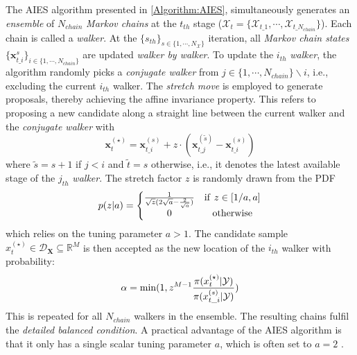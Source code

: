 The \acrshort{AIES} algorithm presented in \ref{Algorithm:AIES}, simultaneously generates an \textit{ensemble} of $N_{chain}$ \textit{Markov chains} at the $t_{th}$ stage ($\mathcal{X}_{t} = \{ \mathcal{X}_{t\_1},\cdots,\mathcal{X}_{t\_N_{chain}}\}$). Each chain is called a \textit{walker}. At the $\{s_{th}\}_{s \in \{1,\cdots,N_{\mathcal{X}}\}}$ iteration, all \textit{Markov chain states} $\{\boldsymbol{x}_{t\_i}^{s}\}_{i \in \{1,\cdots,N_{chain}\}}$ are updated \textit{walker by walker}. To update the $i_{th}$ \textit{walker}, the algorithm randomly picks a \textit{conjugate walker} from $j \in \{ 1,\cdots,N_{chain}\} \backslash i$, i.e., excluding the current $i_{th}$ walker. The \textit{stretch move} is employed to generate proposals, thereby achieving the affine invariance property. This refers to proposing a new candidate along a straight line between the current walker and the \textit{conjugate walker} with
\begin{equation}
    \label{eq: AIES walker}
\boldsymbol{x}_{t}^{(\star)}
=
\boldsymbol{x}_{t\_i}^{(s)}
+
z \cdot 
(\boldsymbol{x}_{t\_j}^{(\tilde{s})} - \boldsymbol{x}_{t\_i}^{(s)})
\end{equation}
where $\tilde{s} = s +1$ if $j < i$ and $\tilde{t}=s$ otherwise, i.e., it denotes the latest available stage of the $j_{th}$ \textit{walker}. The stretch factor $z$ is randomly drawn from the \acrshort{PDF}
\begin{equation}
    \label{eq: AIES Z}
    p(z|a)= \left\{\begin{matrix}
  \frac{1}{\sqrt{z} (2\sqrt{a} - \frac{2}{\sqrt{a} } )}  & {\rm{if} }\ z \in [1 / a, a]  \\
  0 & {\rm{otherwise} }
\end{matrix}\right.
\end{equation}
which relies on the tuning parameter $a>1$. The candidate sample ${x}_{t}^{(\star)} \in \mathcal{D}_{\boldsymbol{X}} \subseteq \mathbb{R}^{M}$ is then accepted as the new location of the $i_{th}$ walker with probability:
\begin{equation}
    \label{eq: AIES acceptance probability}
    \alpha = {\rm{min}}
(1,
z^{M-1} 
\frac{\pi({x}_{t}^{(\star)}|\mathcal{Y})}
{\pi({x}_{t\_{i}}^{(s)}|\mathcal{Y})} 
)
\end{equation}
This is repeated for all $N_{chain}$ walkers in the ensemble. The resulting chains fulfil the \textit{detailed balanced condition}. A practical advantage of the \acrshort{AIES} algorithm is that it only has a single scalar tuning parameter $a$, which is often set to $a=2$ \citep{UQdoc}.
